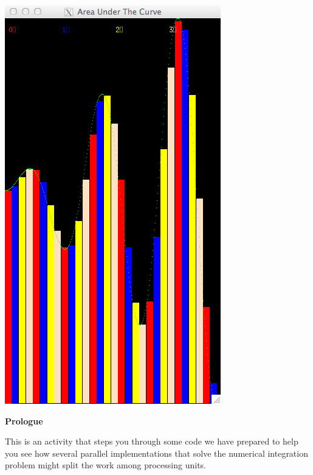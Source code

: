 \documentclass[letterpaper,10pt,openany,oneside]{sphinxmanual}
\begin{document}
\includegraphics{omp_1chunk_static_30rect.png}

\textbf{Prologue}

This is an activity that steps you through some code we have prepared to help you see how several parallel implementations that solve the numerical integration problem might split the work among processing units.
\end{document}
